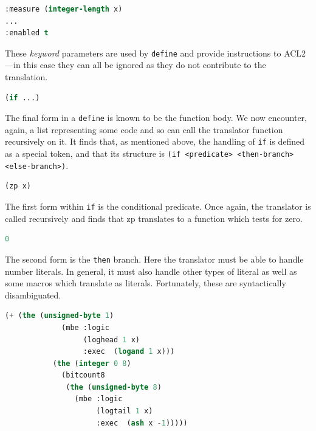 \documentclass[a4paper,12pt,twoside,openright]{report}
\begin{document}
\bigskip
\begin{minipage}{\linewidth}
\begin{lstlisting}[language=lisp]
:measure (integer-length x)
...
:enabled t
\end{lstlisting}
\end{minipage}

These \emph{keyword} parameters are used by \texttt{define} and provide instructions to ACL2---in this case they can all be ignored as they do not contribute to the translation.

\bigskip
\begin{lstlisting}[language=lisp]
(if ...)
\end{lstlisting}

The final form in a \texttt{define} is known to be the function body.  We now encounter, again, a list representing some code and so can call the translator function recursively on it.  It finds that, as mentioned above, the handling of \texttt{if} is defined as a special token, and that its structure is \texttt{(if <predicate> <then-branch> <else-branch>)}.

\bigskip
\begin{lstlisting}[language=lisp]
(zp x)
\end{lstlisting}

The first form within \texttt{if} is the conditional predicate.  Once again, the translator is called recursively and finds that zp translates to a function which tests for zero.

\bigskip
\bigskip
\bigskip
\bigskip
\begin{lstlisting}[language=lisp]
0
\end{lstlisting}

The second form is the \texttt{then} branch.  Here the translator must be able to handle number literals.  In general, it must also handle other types of literal as well as some macros which translate as literals.  Fortunately, these are syntactically disambiguated.

\bigskip
\begin{lstlisting}[language=lisp]
    (+ (the (unsigned-byte 1)
             (mbe :logic
                  (loghead 1 x)
                  :exec  (logand 1 x)))
           (the (integer 0 8)
             (bitcount8
              (the (unsigned-byte 8)
                (mbe :logic
                     (logtail 1 x)
                     :exec  (ash x -1)))))
\end{lstlisting}
\end{document}
